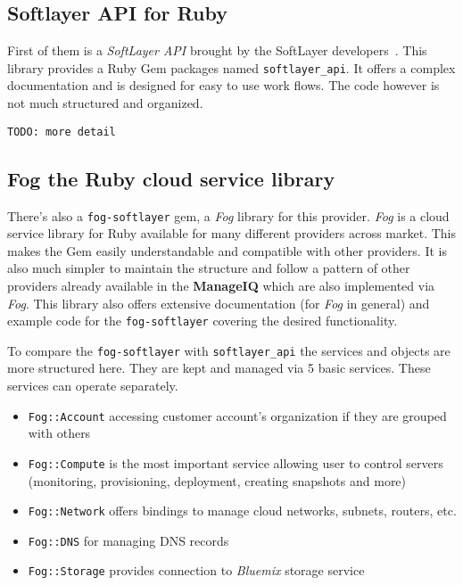 \subsection{Softlayer API for Ruby}
\label{sub:Softlayer-API}

First of them is a \emph{SoftLayer API} brought by the SoftLayer developers~\cite{softlayer_api}. This library provides a Ruby Gem packages named \texttt{softlayer\_api}. It offers a complex documentation and is designed for easy to use work flows. The code however is not much structured and organized.

\noindent\texttt{\color{OliveGreen}TODO: more detail}

\subsection{Fog the Ruby cloud service library}
\label{sub:Fog cloud library}

There's also a \texttt{fog-softlayer} gem, a \emph{Fog} library for this provider. \emph{Fog} is a cloud service library for Ruby available for many different providers across market. This makes the Gem easily understandable and compatible with other providers. It is also much simpler to maintain the structure and follow a pattern of other providers already available in the \textbf{ManageIQ} which are also implemented via \emph{Fog}. This library also offers extensive documentation (for \emph{Fog} in general) and example code for the \texttt{fog-softlayer} covering the desired functionality.

To compare the \texttt{fog-softlayer} with \texttt{softlayer\_api} the services and objects are more structured here. They are kept and managed via 5 basic services. These services can operate separately.

\begin{itemize}
	\item \texttt{Fog::Account} accessing customer account's organization if they are grouped with others
	\item \texttt{Fog::Compute} is the most important service allowing user to control servers (monitoring, provisioning, deployment, creating snapshots and more)
	\item \texttt{Fog::Network} offers bindings to manage cloud networks, subnets, routers, etc.
	\item \texttt{Fog::DNS} for managing DNS records
	\item \texttt{Fog::Storage} provides connection to \emph{Bluemix} storage service
\end{itemize}

